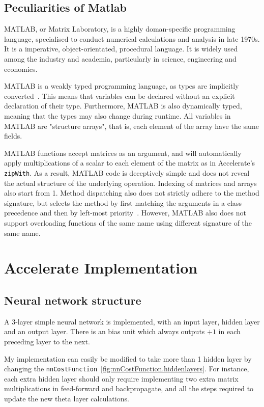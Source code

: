 \subsection{Peculiarities of Matlab} \label{se:impl.matlab.background}

MATLAB, or Matrix Laboratory, is a highly doman-specific programming language, specialised to conduct numerical calculations and analysis in late 1970s. It is a imperative, object-orientated, procedural language. It is widely used among the industry and academia, particularly in science, engineering and economics.

MATLAB is a weakly typed programming language, as types are implicitly converted~\cite{Wiki1}. This means that variables can be declared without an explicit declaration of their type. Furthermore, MATLAB is also dynamically typed, meaning that the types may also change during runtime. All variables in MATLAB are "structure arrays", that is, each element of the array have the same fields. 

MATLAB functions accept matrices as an argument, and will automatically apply multiplications of a scalar to each element of the matrix as in Accelerate's \texttt{zipWith}. As a result, MATLAB code is deceptively simple and does not reveal the actual structure of the underlying operation. Indexing of matrices and arrays also start from 1. Method dispatching also does not strictly adhere to the method signature, but selects the method by first matching the arguments in a class precedence and then by left-most priority~\cite{Mat17}. However, MATLAB also does not support overloading functions of the same name using different signature of the same name.

\section{Accelerate Implementation} \label{se:impl.acc}

\subsection{Neural network structure} \label{se:impl.nn.struct}

A 3-layer simple neural network is implemented, with an input layer, hidden layer and an output layer. There is an bias unit which always outputs $+1$ in each preceding layer to the next. 

My implementation can easily be modified to take more than 1 hidden layer by changing the \texttt{nnCostFunction}~\ref{fig:nnCostFunction.hiddenlayers}. For instance, each extra hidden layer should only require implementing two extra matrix multiplications in feed-forward and backpropagate, and all the steps required to update the new theta layer calculations.


